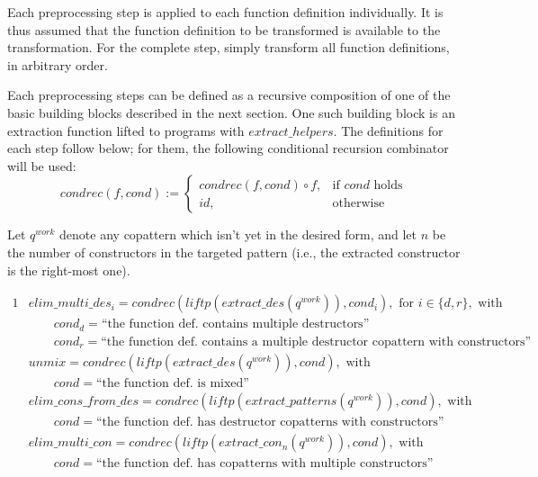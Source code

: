 Each preprocessing step is applied to each function definition individually. It is thus assumed that the function definition to be transformed is available to the transformation. For the complete step, simply transform all function definitions, in arbitrary order.

Each preprocessing steps can be defined as a recursive composition of one of the basic building blocks described in the next section. One such building block is an extraction function lifted to programs with $extract\_helpers$. The definitions for each step follow below; for them, the following conditional recursion combinator will be used:
\[
    condrec(f, cond) :=
\begin{cases}
    condrec(f, cond) \circ f,& \text{if $cond$ holds} \\
   id,& \text{otherwise}
\end{cases}
\]

Let $q^{work}$ denote any copattern which isn't yet in the desired form, and let $n$ be the number of constructors in the targeted pattern (i.e., the extracted constructor is the right-most one).

\begin{framed}

\begin{alignat*}{1}
&elim\_multi\_des_i = condrec(liftp(extract\_des(q^{work})), cond_i), \textrm{ for } i \in \{d, r\}, \textrm{ with } \\
&\qquad cond_d = \textrm{``the function def. contains multiple destructors''} \\
&\qquad cond_r = \textrm{``the function def. contains a multiple destructor copattern with constructors''} \\
&unmix = condrec(liftp(extract\_des(q^{work})), cond), \textrm{ with}\\
&\qquad cond = \textrm{``the function def. is mixed''} \\
&elim\_cons\_from\_des = condrec(liftp(extract\_patterns(q^{work})), cond), \textrm{ with}\\
&\qquad cond = \textrm{``the function def. has destructor copatterns with constructors''} \\
&elim\_multi\_con = condrec(liftp(extract\_con_n(q^{work})), cond), \textrm{ with}\\
&\qquad cond = \textrm{``the function def. has copatterns with multiple constructors''}
\end{alignat*}

\end{framed}

